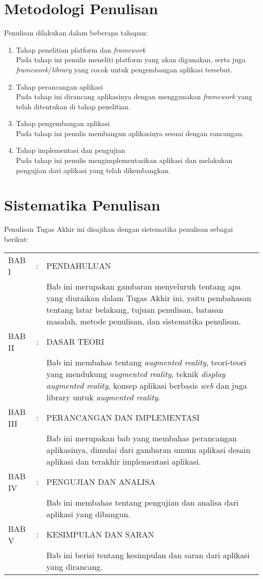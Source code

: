 \section{Metodologi Penulisan}
\label{sec:metodologi_penulisan}
Penulisan dilakukan dalam beberapa tahapan:
\begin{enumerate}
\item Tahap penelitian platform dan \textit{framework}\\
Pada tahap ini penulis meneliti platform yang akan digunakan, serta juga \textit{framework}/\textit{library} yang cocok untuk pengembangan aplikasi tersebut.
\item Tahap perancangan aplikasi\\
Pada tahap ini dirancang aplikasinya dengan menggunakan \textit{framework} yang telah ditentukan di tahap penelitian. 
\item Tahap pengembangan aplikasi\\
Pada tahap ini penulis membangun aplikasinya sesuai dengan rancangan.
\item Tahap implementasi dan pengujian\\
Pada tahap ini penulis mengimplementasikan aplikasi dan melakukan pengujian dari aplikasi yang telah dikembangkan.
\end{enumerate}

\section{Sistematika Penulisan}
\label{sec:sistematika_penulisan}
Penulisan Tugas Akhir ini disajikan dengan sistematika penulisan sebagai berikut:
\par\noindent
\begin{longtable}{llp{11cm}}
BAB I & : & PENDAHULUAN\\
& & Bab ini merupakan gambaran menyeluruh tentang apa yang diuraikan dalam Tugas Akhir ini, yaitu pembahasan tentang latar belakang, tujuan penulisan, batasan masalah, metode penulisan, dan sistematika penulisan.\\
BAB II & : & DASAR TEORI\\
& & Bab ini membahas tentang \textit{augmented reality}, teori-teori yang mendukung \textit{augmented reality}, teknik \textit{display} \textit{augmented reality}, konsep aplikasi berbasis \textit{web} dan juga library untuk \textit{augmented reality}.\\
BAB III & : & PERANCANGAN DAN IMPLEMENTASI\\
\nopagebreak
& & Bab ini merupakan bab yang membahas perancangan aplikasinya, dimulai dari gambaran umum aplikasi desain aplikasi dan terakhir implementasi aplikasi.\\
BAB IV & : & PENGUJIAN DAN ANALISA\\
\nopagebreak
& & Bab ini membahas tentang pengujian dan analisa dari aplikasi yang dibangun.\\
BAB V & : & KESIMPULAN DAN SARAN\\
\nopagebreak 
& & Bab ini berisi tentang kesimpulan dan saran dari  aplikasi yang dirancang.

\end{longtable}